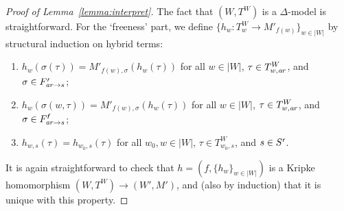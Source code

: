 \documentclass[a4paper,UKenglish,cleveref, autoref]{lipics-v2019}
\newcommand{\keyscript}[1]{\text{\normalfont\sffamily\itshape #1}}
\newcommand{\ari}{\mathit{a\mkern -1mu r}}
\newcommand{\nominal}{\keyscript{n}}
\newcommand{\rigid}{\keyscript{r}}
\newcommand{\flexible}{\keyscript{f}}
\begin{document}
\begin{proof}[Proof of Lemma~\ref{lemma:interpret}]
  The fact that \((W, T^{W})\) is a \(\Delta\)-model is straightforward.
  For the `freeness' part, we define \(\{ h_{w} \colon T^{W}_{w} \to M'_{f(w)} \}_{w \in |W|}\) by structural induction on hybrid terms:
  \begin{enumerate}
  \item \(h_{w}(\sigma(\tau)) = M'_{f(w),\sigma}(h_{w}(\tau))\) for all \(w \in |W|\), \(\tau \in T^{W}_{w,\ari}\), and \(\sigma \in F^{\rigid}_{\ari \to s}\);

  \item \(h_{w}(\sigma(w, \tau)) = M'_{f(w),\sigma}(h_{w}(\tau))\) for all \(w \in |W|\), \(\tau \in T^{W}_{w,\ari}\), and \(\sigma \in F^{\flexible}_{\ari \to s}\);

  \item \(h_{w, s}(\tau) = h_{w_{0}, s}(\tau)\) for all \(w_{0}, w \in |W|\), \(\tau \in T^{W}_{w_{0}, s}\), and \(s \in S^{\rigid}\).

  \end{enumerate}
  It is again straightforward to check that \(h = (f, \{ h_{w} \}_{w \in |W|})\) is a Kripke homomorphism \((W, T^{W}) \to (W', M')\), and (also by induction) that it is unique with this property.
\end{proof}
\end{document}
